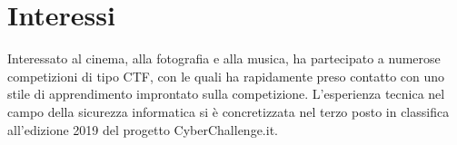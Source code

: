 \documentclass[a4paper,10pt]{article} %
\begin{document}
\section{Interessi}

Interessato al cinema, alla fotografia e alla musica, ha partecipato a numerose competizioni di tipo CTF, con le quali ha rapidamente preso contatto con uno stile di apprendimento improntato sulla competizione. L'esperienza tecnica nel campo della sicurezza informatica si è concretizzata nel terzo posto in classifica all'edizione 2019 del progetto CyberChallenge.it.



%
%
%
\end{document}
